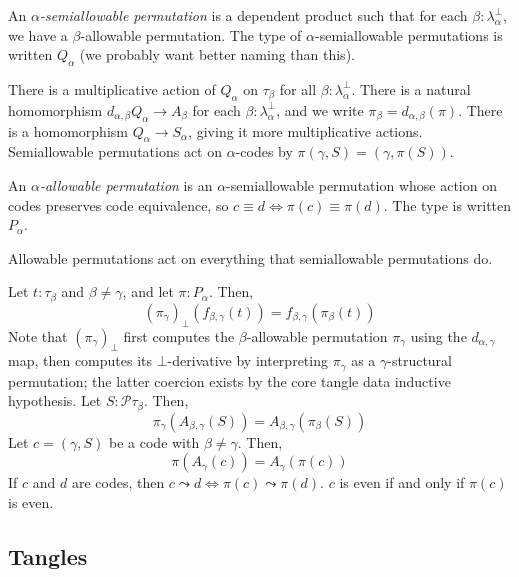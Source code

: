 \documentclass{article}
\begin{document}
\begin{definition}
    An \emph{\( \alpha \)-semiallowable permutation} is a dependent product such that for each \( \beta : \lambda^\bot_\alpha \), we have a \( \beta \)-allowable permutation.
    The type of \( \alpha \)-semiallowable permutations is written \( Q_\alpha \) (we probably want better naming than this).
\end{definition}
\begin{lemma}
    There is a multiplicative action of \( Q_\alpha \) on \( \tau_\beta \) for all \( \beta : \lambda^\bot_\alpha \).
    There is a natural homomorphism \( d_{\alpha,\beta} Q_\alpha \to A_\beta \) for each \( \beta : \lambda^\bot_\alpha \), and we write \( \pi_\beta = d_{\alpha,\beta}(\pi) \).
    There is a homomorphism \( Q_\alpha \to S_\alpha \), giving it more multiplicative actions.
    Semiallowable permutations act on \( \alpha \)-codes by \( \pi(\gamma, S) = (\gamma, \pi(S)) \).
\end{lemma}
\begin{definition}
    An \emph{\( \alpha \)-allowable permutation} is an \( \alpha \)-semiallowable permutation whose action on codes preserves code equivalence, so \( c \equiv d \iff \pi(c) \equiv \pi(d) \).
    The type is written \( P_\alpha \).
\end{definition}
\begin{lemma}
    Allowable permutations act on everything that semiallowable permutations do.
\end{lemma}
\begin{theorem}
    Let \( t : \tau_\beta \) and \( \beta \neq \gamma \), and let \( \pi : P_\alpha \).
    Then,
    \[ (\pi_\gamma)_\bot(f_{\beta,\gamma}(t)) = f_{\beta,\gamma}(\pi_\beta(t)) \]
    Note that \( (\pi_\gamma)_\bot \) first computes the \( \beta \)-allowable permutation \( \pi_\gamma \) using the \( d_{\alpha,\gamma} \) map, then computes its \( \bot \)-derivative by interpreting \( \pi_\gamma \) as a \( \gamma \)-structural permutation; the latter coercion exists by the core tangle data inductive hypothesis.
    Let \( S : \mathcal P \tau_\beta \).
    Then,
    \[ \pi_\gamma(A_{\beta,\gamma}(S)) = A_{\beta,\gamma}(\pi_\beta(S)) \]
    Let \( c = (\gamma, S) \) be a code with \( \beta \neq \gamma \).
    Then,
    \[ \pi(A_\gamma(c)) = A_\gamma(\pi(c)) \]
    If \( c \) and \( d \) are codes, then \( c \leadsto d \iff \pi(c) \leadsto \pi(d) \).
    \( c \) is even if and only if \( \pi(c) \) is even.
\end{theorem}

\subsection{Tangles}
\end{document}
